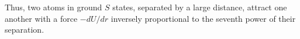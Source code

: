 Thus, two atoms in ground $S$ states, separated by a large distance, attract one another with a force $-dU/dr$ inversely proportional to the seventh power of their separation.
